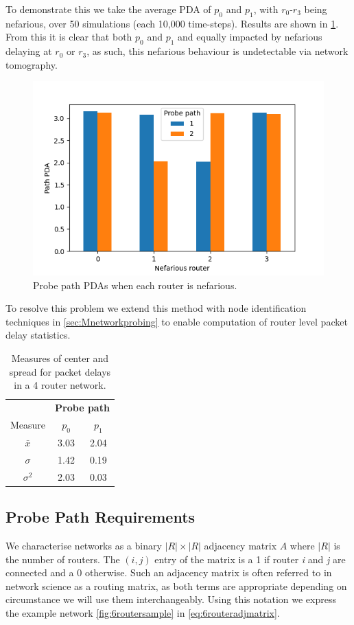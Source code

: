 To demonstrate this we take the average PDA of $p_0$ and $p_1$, with $r_0$-$r_3$ being nefarious, over 50 simulations (each 10,000 time-steps). Results are shown in \cref{fig:probepathpdas}. From this it is clear that both $p_0$ and $p_1$ and equally impacted by nefarious delaying at $r_0$ or $r_3$, as such, this nefarious behaviour is undetectable via network tomography.\par
\begin{figure}[H]
    \centering
    \includegraphics{figs/background/path_pdas.png}
    \caption{Probe path PDAs when each router is nefarious.}
    \label{fig:probepathpdas}
\end{figure}
To resolve this problem we extend this method with node identification techniques in \cref{sec:Mnetworkprobing} to enable computation of router level packet delay statistics.
\begin{table}[H]
    \centering
    \begin{tabular}{@{}ccc@{}}
        \toprule
        & \multicolumn{2}{c}{\textbf{Probe path}}\\
        \cmidrule(lr){2-3}
        Measure & $p_0$ & $p_1$ \\
        \midrule
        $\bar{x}$   & 3.03 & 2.04 \\
        $\sigma$    & 1.42 & 0.19 \\
        $\sigma^2$  & 2.03 & 0.03 \\
        \bottomrule
    \end{tabular}
    \caption{Measures of center and spread for packet delays in a 4 router network.}
    \label{tbl:4routerstats}
\end{table}

\subsection{Probe Path Requirements}
\label{ssec:B7routerexample}
We characterise networks as a binary $|R|\times|R|$ adjacency matrix $A$ where $|R|$ is the number of routers. The $(i, j)$ entry of the matrix is a 1 if router \emph{i} and \emph{j} are connected and a 0 otherwise. Such an adjacency matrix is often referred to in network science as a routing matrix, as both terms are appropriate depending on circumstance we will use them interchangeably. Using this notation we express the example network \cref{fig:6routersample} in \cref{eq:6routeradjmatrix}.

